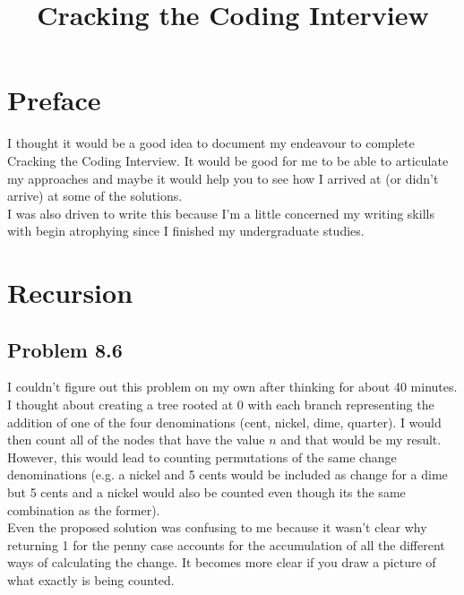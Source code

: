 \documentclass{article}
\title{Cracking the Coding Interview}
\begin{document}
\section*{Preface}
I thought it would be a good idea to document my endeavour 
to complete Cracking the Coding Interview. It would be good
for me to be able to articulate my approaches and maybe it would help you to 
see how I arrived at (or didn't arrive) at some of the solutions. \\

I was also driven to write this because I'm a little concerned my writing
skills with begin atrophying since I finished my undergraduate studies.
\section*{Recursion}
\subsection*{Problem 8.6}
I couldn't figure out this problem on my own after thinking for about 40 minutes.
I thought about creating a tree rooted at 0 with each branch representing the
addition of one of the four denominations (cent, nickel, dime, quarter). I
would then count all of the nodes that have the value $n$ and that would be my result. \\

However, this would lead to counting permutations of the same change denominations (e.g.
a nickel and 5 cents would be included as change for a dime but 5 cents and a nickel
would also be counted even though its the same combination as the former). \\

Even the proposed solution was confusing to me because it wasn't clear why returning 1 
for the penny case accounts for the accumulation of all the different ways of calculating
the change. It becomes more clear if you draw a picture of what exactly is being counted.
\end{document}
